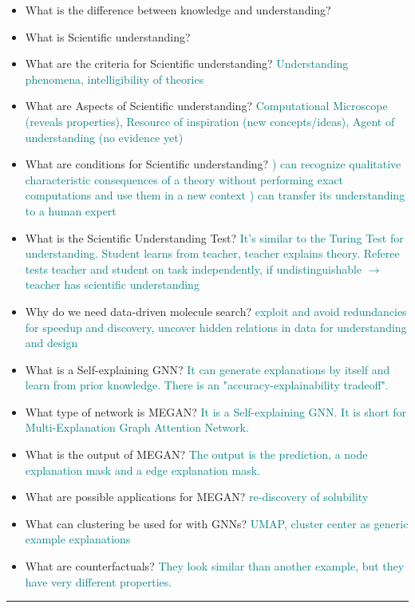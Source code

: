 \documentclass{report}
\newcommand{\asw}[2][teal]{}
\renewcommand{\asw}[2][teal]{\textcolor{#1}{#2}}
\begin{document}
		\begin{itemize}
		\item What is the difference between knowledge and understanding?
		\asw{\newline }
		\item What is Scientific understanding?
		\asw{\newline }
		\item What are the criteria for Scientific understanding?
		\asw{\newline Understanding phenomena, intelligibility of theories}
		\item What are Aspects of Scientific understanding?
		\asw{\newline Computational Microscope (reveals properties), Resource of inspiration (new concepts/ideas), Agent of understanding (no evidence yet)}
		\item What are conditions for Scientific understanding?
		\asw{) can recognize qualitative characteristic consequences of a theory without performing exact computations and use them in a new context
			\newline 2) can transfer its understanding to a human expert}
		\item What is the Scientific Understanding Test?
		\asw{\newline It's similar to the Turing Test for understanding. Student learns from teacher, teacher explains theory. Referee tests teacher and student on task independently, if undistinguishable $\rightarrow$ teacher has scientific understanding}
		
		\item Why do we need data-driven molecule search?
		\asw{\newline exploit and avoid redundancies for speedup and discovery, uncover hidden relations in data for understanding and design}
		\item What is a Self-explaining GNN?
		\asw{\newline It can generate explanations by itself and learn from prior knowledge. There is an "accuracy-explainability tradeoff".}
		\item What type of network is MEGAN?
		\asw{\newline It is a Self-explaining GNN. It is short for Multi-Explanation Graph Attention Network.}
		\item What is the output of MEGAN?
		\asw{\newline The output is the prediction, a node explanation mask and a edge explanation mask.}
		\item What are possible applications for MEGAN?
		\asw{\newline re-discovery of solubility}
		\item What can clustering be used for with GNNs?
		\asw{\newline UMAP, cluster center as generic example explanations}
		\item What are counterfactuals?
		\asw{\newline They look similar than another example, but they have very different properties.}
		\end{itemize}
		\hrule 
	
\end{document}
